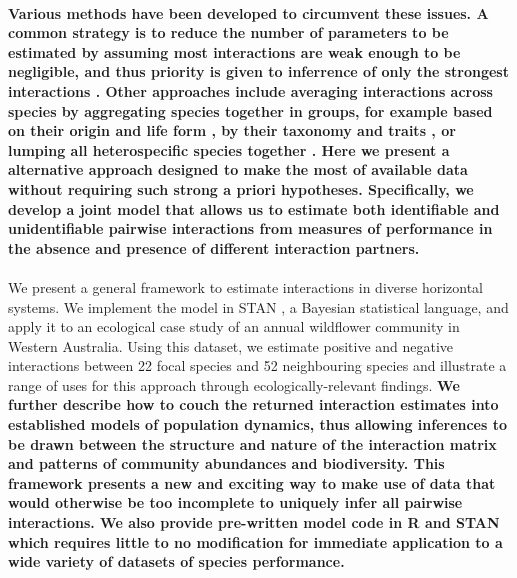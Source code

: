 \documentclass[a4,12pt]{article}
\begin{document}
\begin{refsection}
    \paragraph{} %
    \textbf{Various methods have been developed to circumvent these issues. A common strategy is to reduce the number of parameters to be estimated by assuming most interactions are weak enough to be negligible, and thus priority is given to inferrence of only the strongest interactions \parencite{Weiss-Lehman2022}. Other approaches include averaging interactions across species by aggregating species together in groups, for example based on their origin and life form \parencite{Martyn2021}, by their taxonomy and traits \parencite{Uriarte2004}, or lumping all heterospecific species together \parencite{Chu2015}. Here we present a alternative approach designed to make the most of available data without requiring such strong a priori hypotheses. Specifically, we develop a joint model that allows us to estimate both identifiable and unidentifiable pairwise interactions from measures of performance in the absence and presence of different interaction partners.}


    \paragraph{} 
    We present a general framework to estimate interactions in diverse horizontal systems. We implement the model in STAN \parencite{Carpenter2017}, a Bayesian statistical language, and apply it to an ecological case study of an annual wildflower community in Western Australia. Using this dataset, we estimate positive and negative interactions between 22 focal species and 52 neighbouring species and illustrate a range of uses for this approach through ecologically-relevant findings. \textbf{We further describe how to couch the returned interaction estimates into established models of population dynamics, thus allowing inferences to be drawn between the structure and nature of the interaction matrix and patterns of community abundances and biodiversity. This framework presents a new and exciting way to make use of data that would otherwise be too incomplete to uniquely infer all pairwise interactions. We also provide  pre-written model code in R and STAN which requires little to no modification for immediate application to a wide variety of datasets of species performance.}



\end{refsection}
\end{document}
